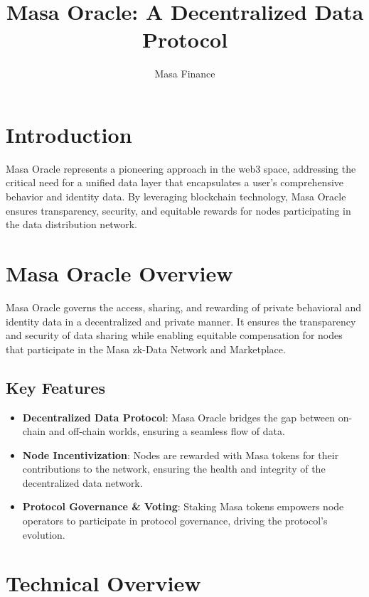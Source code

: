 \documentclass{article}
\title{Masa Oracle: A Decentralized Data Protocol}
\author{Masa Finance}
\date{}
\begin{document}
\maketitle

\section{Introduction}

Masa Oracle represents a pioneering approach in the web3 space, addressing the critical need for a unified data layer that encapsulates a user's comprehensive behavior and identity data. By leveraging blockchain technology, Masa Oracle ensures transparency, security, and equitable rewards for nodes participating in the data distribution network.

\section{Masa Oracle Overview}

Masa Oracle governs the access, sharing, and rewarding of private behavioral and identity data in a decentralized and private manner. It ensures the transparency and security of data sharing while enabling equitable compensation for nodes that participate in the Masa zk-Data Network and Marketplace.

\subsection{Key Features}

\begin{itemize}
    \item \textbf{Decentralized Data Protocol}: Masa Oracle bridges the gap between on-chain and off-chain worlds, ensuring a seamless flow of data.
    \item \textbf{Node Incentivization}: Nodes are rewarded with Masa tokens for their contributions to the network, ensuring the health and integrity of the decentralized data network.
    \item \textbf{Protocol Governance \& Voting}: Staking Masa tokens empowers node operators to participate in protocol governance, driving the protocol's evolution.
\end{itemize}

\section{Technical Overview}
\end{document}
